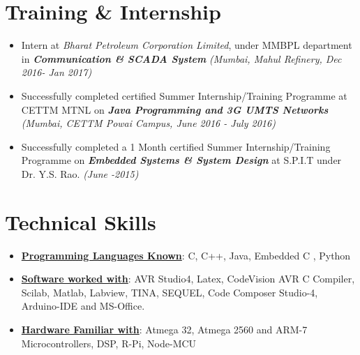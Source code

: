 \documentclass[10pt,a4paper,sans]{moderncv} %
\begin{document}


\section{Training \& Internship}

\begin{itemize}

\item Intern at\textit{ Bharat Petroleum Corporation Limited}, under MMBPL department in \textbf{\textit{Communication \& SCADA System }}\textit{ (Mumbai, Mahul Refinery, Dec 2016- Jan 2017) } \newline

\item Successfully completed certified Summer Internship/Training Programme at CETTM MTNL on \textbf{\textit{Java Programming and 3G UMTS Networks}}                        \textit {(Mumbai, CETTM Powai Campus, June 2016 -  July 2016) } \newline

\item Successfully completed a 1 Month certified Summer Internship/Training Programme on \textbf{\textit {Embedded Systems \& System Design}} at S.P.I.T under Dr. Y.S. Rao.    \textit { (June -2015) }


\end{itemize}




\section{Technical Skills}

\begin{itemize}
\item\textbf{\underline{Programming Languages Known}}: C, C++, Java, Embedded C , Python \newline

\item \textbf{\underline{Software worked with}}:  AVR Studio4, Latex, CodeVision AVR C Compiler, Scilab, Matlab, Labview, TINA, SEQUEL, Code Composer Studio-4, Arduino-IDE and MS-Office.  \newline

\item \textbf{\underline{Hardware Familiar with}}: Atmega 32, Atmega 2560 and ARM-7 Microcontrollers, DSP, R-Pi, Node-MCU

\end {itemize}
\end{document}
